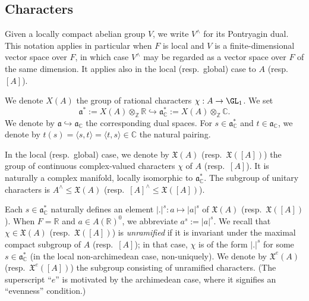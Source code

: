 \subsection{Characters}\label{sec:cnjeor2mwy}
Given a locally compact abelian group $V$, we write $V^\wedge$ for its Pontryagin dual.  This notation applies in particular when $F$ is local and $V$ is a finite-dimensional vector space over $F$, in which case $V^\wedge$ may be regarded as a vector space over $F$ of the same dimension.  It applies also in the local (resp.\ global) case to $A$ (resp.\ $[A]$).

We denote $X(A)$ the group of rational characters $\chi : A \rightarrow \GL_1$.  We set
\begin{equation}\label{eq:frak-a-star-X-A}
  \mathfrak{a}^* := X(A) \otimes_{\mathbb{Z}} \mathbb{R} \hookrightarrow \mathfrak{a}_{\mathbb{C}}^* := X(A) \otimes_{\mathbb{Z}} \mathbb{C}.
\end{equation}
We denote by $\mathfrak{a} \hookrightarrow \mathfrak{a}_{\mathbb{C}}$ the corresponding dual spaces.  For $s \in \mathfrak{a}_{\mathbb{C}}^*$ and $t \in \mathfrak{a}_{\mathbb{C}}$, we denote by $t(s) = \langle s, t \rangle = \langle t,s  \rangle \in \mathbb{C}$ the natural pairing.

In the local (resp.\ global) case, we denote  by $\mathfrak{X}(A)$ (resp.\ $\mathfrak{X}([A])$) the group of continuous complex-valued characters $\chi$ of $A$ (resp.\ $[A]$).  It is naturally a complex manifold, locally isomorphic to $\mathfrak{a}^*_{\mathbb{C}}$.  The subgroup of unitary characters is $A^\wedge \leq \mathfrak{X}(A)$ (resp.\ $[A]^\wedge \leq \mathfrak{X}([A])$).

Each $s \in \mathfrak{a}_{\mathbb{C}}^*$ naturally defines an element $|.|^s : a \mapsto |a|^s$ of $\mathfrak{X}(A)$ (resp.\ $\mathfrak{X}([A])$).  When $F = \mathbb{R}$ and $a \in A(\mathbb{R})^0$, we abbreviate $a^s := |a|^s$.  We recall that $\chi \in \mathfrak{X}(A)$ (resp.\ $\mathfrak{X}([A])$) is \emph{unramified} if it is invariant under the maximal compact subgroup of $A$ (resp.\ $[A]$); in that case, $\chi$ is of the form $|.|^{s}$ for some $s \in \mathfrak{a}_{\mathbb{C}}^*$ (in the local non-archimedean case, non-uniquely).  We denote by  $\mathfrak{X}^e(A)$ (resp.\ $\mathfrak{X}^e([A])$) the subgroup consisting of unramified characters.  (The superscript ``$e$'' is motivated by the archimedean case, where it signifies an ``evenness'' condition.)

